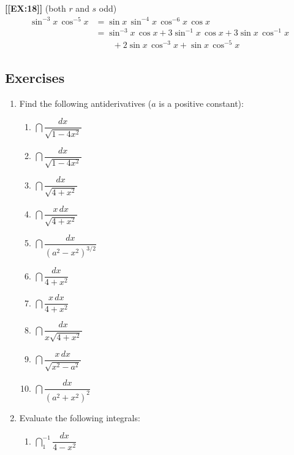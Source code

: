 {\bf [[EX:18]]} \quad(both $r$ and $s$ odd)
\begin{align*}
\sin^{-3}{x}\,\cos^{-5}{x}
  &= \sin{x}\,\sin^{-4}{x}\,\cos^{-6}{x}\,\cos{x} \\
  &= \sin^{-3}{x}\,\cos{x}+3\sin^{-1}{x}\,\cos{x}+ 3\sin{x}\,\cos^{-1}{x} \\
  & \mbox{}\qquad +2\sin{x}\,\cos^{-3}{x}+ \sin{x}\,\cos^{-5}{x}
\end{align*}


\subsection{Exercises}
\label{subsec:exercises}




\begin{enumerate}
\item Find the following antiderivatives ($a$ is a positive constant):



  \begin{enumerate}
  \item $\dint \dfrac{dx}{\sqrt{1-4x^2}}$


  \item $\dint \dfrac{dx}{\sqrt{1-4x^2}}$


  \item $\dint \dfrac{dx}{\sqrt{4+x^2}}$


  \item $\dint \dfrac{x\,dx}{\sqrt{4+x^2}}$

  \item $\dint \dfrac{dx}{(a^2-x^2)^{3/2}}$


  \item $\dint \dfrac{dx}{4+x^2}$


  \item $\dint \dfrac{x\,dx}{4+x^2}$

  \item $\dint \dfrac{dx}{x\sqrt{4+x^2}}$


  \item $\dint \dfrac{x\,dx}{\sqrt{x^2-a^2}}$


  \item $\dint \dfrac{dx}{(a^2+x^2)^2}$
\mbox{}


\end{enumerate}
\item Evaluate the following integrals:



  \begin{enumerate}
  \item $\dint_1^{-1} \dfrac{dx}{4-x^2}$



\end{enumerate}
\end{enumerate}
